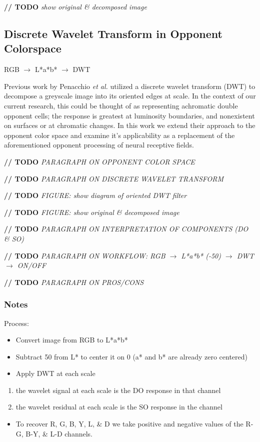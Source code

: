 \documentclass[journal,onecolumn]{IEEEtran}
\begin{document}
\textbf{// TODO} \textit{show original \& decomposed image}


\subsection{Discrete Wavelet Transform in Opponent Colorspace}

RGB $\rightarrow$ L*a*b* $\rightarrow$ DWT

Previous work by Penacchio \textit{et al.} \cite{otazu:plosone} utilized a discrete wavelet transform (DWT) to decompose a greyscale image into its oriented edges at scale. In the context of our current research, this could be thought of as representing achromatic double opponent cells; the response is greatest at luminosity boundaries, and nonexistent on surfaces or at chromatic changes. In this work we extend their approach to the opponent color space and examine it's applicability as a replacement of the aforementioned opponent processing of neural receptive fields.

\textbf{// TODO} \textit{PARAGRAPH ON OPPONENT COLOR SPACE}

\textbf{// TODO} \textit{PARAGRAPH ON DISCRETE WAVELET TRANSFORM}

\textbf{// TODO} \textit{FIGURE: show diagram of oriented DWT filter}

\textbf{// TODO} \textit{FIGURE: show original \& decomposed image}

\textbf{// TODO} \textit{PARAGRAPH ON INTERPRETATION OF COMPONENTS (DO \& SO)}

\textbf{// TODO} \textit{PARAGRAPH ON WORKFLOW: RGB $\rightarrow$ L*a*b* (-50) $\rightarrow$ DWT $\rightarrow$ ON/OFF}

\textbf{// TODO} \textit{PARAGRAPH ON PROS/CONS}

\subsubsection{Notes}

Process:
\begin{itemize}
    \item Convert image from RGB to L*a*b*
    \item Subtract 50 from L* to center it on 0 (a* and b* are already zero centered)
    \item Apply DWT at each scale
\end{itemize}
\begin{enumerate}
    \item the wavelet signal at each scale is the DO response in that channel
    \item the wavelet residual at each scale is the SO response in the channel
\end{enumerate}
\begin{itemize}
    \item To recover R, G, B, Y, L, \& D we take positive and negative values of the R-G, B-Y, \& L-D channels.
\end{itemize}
\end{document}
